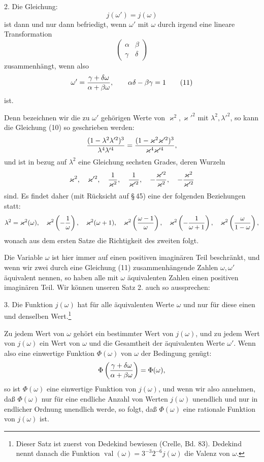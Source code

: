 \documentclass[11pt]{article}
\begin{document}
2. Die Gleichung:
\begin{equation}
j(\omega')=j(\omega)
\tag{10}
\end{equation}
ist dann und nur dann befriedigt, wenn $\omega'$ mit $\omega$ durch irgend eine lineare Transformation
\[
\begin{pmatrix}\alpha&\beta\\ \gamma&\delta\end{pmatrix}
\]
zusammenhängt, wenn also
\begin{equation}
\omega'={\gamma+\delta\omega\over\alpha+\beta\omega},
\qquad
\alpha\delta-\beta\gamma=1
\tag{11}
\end{equation}
ist.

Denn bezeichnen wir die zu $\omega'$ gehörigen Werte von $\varkappa^2,\varkappa'^2$ mit $\lambda^2,\lambda'^2$, so kann die Gleichung (10) so geschrieben werden:
\[
{(1-\lambda^2\lambda'^2)^3\over\lambda^4\lambda'^4}
={ (1-\varkappa^2\varkappa'^2)^3\over\varkappa^4\varkappa'^4},
\]
und ist in bezug auf $\lambda^2$ eine Gleichung sechsten Grades, deren Wurzeln
\[
\varkappa^2,
\quad \varkappa'^2,
\quad {1\over\varkappa^2},
\quad {1\over\varkappa'^2},
\quad -{\varkappa'^2\over\varkappa^2},
\quad -{\varkappa^2\over\varkappa'^2}
\]
sind. Es findet daher (mit Rücksicht auf \S\,45) eine der folgenden Beziehungen statt:
\[
\lambda^2=\varkappa^2(\omega),
\quad \varkappa^2\left(-{1\over\omega}\right),
\quad \varkappa^2(\omega+1),
\quad \varkappa^2\left({\omega-1\over\omega}\right),
\quad \varkappa^2\left(-{1\over\omega+1}\right),
\quad \varkappa^2\left({\omega\over1-\omega}\right),
\]
wonach aus dem ersten Satze die Richtigkeit des zweiten folgt.

Die Variable $\omega$ ist hier immer auf einen positiven imaginären Teil beschränkt, und wenn wir zwei durch eine Gleichung (11) zusammenhängende Zahlen $\omega,\omega'$ äquivalent nennen, so haben alle mit $\omega$ äquivalenten Zahlen einen positiven imaginären Teil. Wir können unseren Satz 2. auch so aussprechen:

3. Die Funktion $j(\omega)$ hat für alle äquivalenten Werte $\omega$ und nur für diese einen und denselben Wert.\footnote{Dieser Satz ist zuerst von Dedekind bewiesen (Crelle, Bd. 83). Dedekind nennt danach die Funktion $\operatorname{val}(\omega)=3^{-3}2^{-6}j(\omega)$ die Valenz von $\omega$.}

Zu jedem Wert von $\omega$ gehört ein bestimmter Wert von $j(\omega)$, und zu jedem Wert von $j(\omega)$ ein Wert von $\omega$ und die Gesamtheit der äquivalenten Werte $\omega'$. Wenn also eine einwertige Funktion $\Phi(\omega)$ von $\omega$ der Bedingung genügt:
\[
\Phi\left({\gamma+\delta\omega\over\alpha+\beta\omega}\right)=\Phi(\omega),
\]
so ist $\Phi(\omega)$ eine einwertige Funktion von $j(\omega)$, und wenn wir also annehmen, daß $\Phi(\omega)$ nur für eine endliche Anzahl von Werten $j(\omega)$ unendlich und nur in endlicher Ordnung unendlich werde, so folgt, daß $\Phi(\omega)$ eine rationale Funktion von $j(\omega)$ ist.
\end{document}
